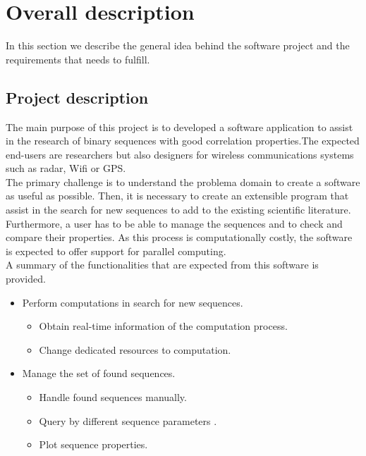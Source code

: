 \section{Overall description}

  In this section we describe the  general idea behind the software project  and the requirements that needs to fulfill.
  \subsection{Project description}

  The main purpose of this project is to developed a software application to assist in the research of binary sequences with
  good correlation properties.The expected end-users are researchers but also designers for wireless communications systems such as radar, Wifi or GPS.\\

  The primary challenge is to understand the problema domain to create a software as useful as possible. Then, it is necessary to create an extensible program that assist in the   search  for new sequences to add to the existing scientific literature. Furthermore, a user has to  be able to  manage the sequences and  to check and compare their properties. As this process is computationally costly,  the software is expected to offer support for parallel computing.\\


A summary of the functionalities that are expected from
  this software is provided.

  \begin{itemize}
    \item Perform computations in search for new sequences.\\
            \begin{itemize}
              \item Obtain real-time information of the computation process.
              \item Change dedicated resources to computation.
            \end{itemize}
    \item Manage the set of found sequences.
            \begin{itemize}
              \item Handle found sequences manually.
              \item Query by different sequence parameters .
              \item Plot sequence properties.
            \end{itemize}
  \end{itemize}

